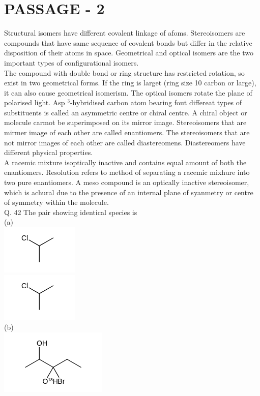 \documentclass[10pt]{article}
\begin{document}
\section*{PASSAGE - 2}
Structural isomers have different covalent linkage of afoms. Stereoisomers are compounds that have same sequence of covalent bonds but differ in the relative disposition of their atoms in space. Geometrical and optical isomers are the two important types of configurational isomers.\\
The compound with double bond or ring structure has restricted rotation, so exist in two geometrical forms. If the ring is larget (ring size 10 carbon or large), it can also cause geometrical isomerism. The optical isomers rotate the plane of polarised light. Asp ${ }^{3}$-hybridised carbon atom bearing fout differeat types of substituents is called an asymmetric centre or chiral centre. A chiral object or molecule carmot be superimposed on its mirror image. Stereoisomers that are mirmer image of each other are called enantiomers. The stereoisomers that are not mirror images of each other are called diastereomens. Diastereomers have different physical properties.\\
A racemic mixture isoptically inactive and contains equal amount of both the enantiomers. Resolution refers to method of separating a racemic mixhure into two pure enantiomers. A meso compound is an optically inactive stereoisomer, which is achural due to the presence of an internal plane of syanmetry or centre of symmetry within the molecule.\\
Q. 42 The pair showing identical species is\\
(a)\\
\includegraphics{smile-53dde03d6ef35368e8eacd333bdd607ac11fce5f}\\
\includegraphics{smile-b8c01f1b3e3e4e7da10eb3fc1cafcb0768c98b4f}\\
(b)\\
\includegraphics{smile-5dc5442aed3690d05ccf49d2490a02b156430c3e}\\
\end{document}
